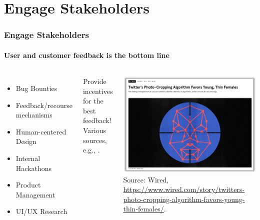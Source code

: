 \documentclass[11pt,
               aspectratio=169,
               hyperref={colorlinks}
               ]{beamer}
\begin{document}
	\section{Engage Stakeholders}

		\begin{frame}
			
			\frametitle{Engage Stakeholders}
			\framesubtitle{User and customer feedback is the bottom line}
			
			\begin{columns}
				\vspace{-5pt}
				\begin{itemize}
					\item Bug Bounties
					\item Feedback/recourse mechanisms
					\item Human-centered Design
					\item Internal Hackathons
					\item Product Management
					\item UI/UX Research
				\end{itemize}
				\noindent Provide incentives for the best feedback!\\
				\vspace{5pt}
				\tiny{Various sources, e.g., \cite{schwartz2022towards}.}

				
				
				\centering
				\newline
				\includegraphics[width=\textwidth]{../img/engage.png} 
				\newline
				\tiny{Source: Wired, \url{https://www.wired.com/story/twitters-photo-cropping-algorithm-favors-young-thin-females/}.}
			\end{columns}
					
		\end{frame}
\end{document}
